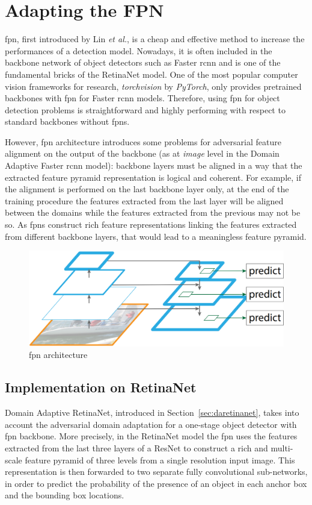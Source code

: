 \documentclass[%
    corpo=12pt,
    twoside,
    stile=classica,   
    tipotesi=magistrale,
    evenboxes,
    english,
	numerazioneromana,
]{toptesi}
\begin{document}
\section{Adapting the FPN}
\acrfull{fpn}, first introduced by Lin \textit{et al.}\cite{lin2017feature}, is a cheap and effective method to increase the performances of a detection model. Nowadays, it is often included in the backbone network of object detectors such as Faster \gls{rcnn} and is one of the fundamental bricks of the RetinaNet model. One of the most popular computer vision frameworks for research, \textit{torchvision} by \textit{PyTorch}\cite{paszke2019pytorch}, only provides pretrained backbones with \gls{fpn} for Faster \gls{rcnn} models. Therefore, using \gls{fpn} for object detection problems is straightforward and highly performing with respect to standard backbones without \glspl{fpn}.

However, \gls{fpn} architecture introduces some problems for adversarial feature alignment on the output of the backbone (as at \textit{image} level in the Domain Adaptive Faster \gls{rcnn} model): backbone layers must be aligned in a way that the extracted feature pyramid representation is logical and coherent. For example, if the alignment is performed on the last backbone layer only, at the end of the training procedure the features extracted from the last layer will be aligned between the domains while the features extracted from the previous may not be so. As \glspl{fpn} construct rich feature representations linking the features extracted from different backbone layers, that would lead to a meaningless feature pyramid.

\begin{figure}[ht]
	\centering
	\includegraphics[width=.6\linewidth]{imgs/fpn.png}
	\caption{\Gls{fpn} architecture\cite{chen2018domain}}
	\label{fig:fpn}
\end{figure}

\subsection{Implementation on RetinaNet}
Domain Adaptive RetinaNet, introduced in Section~\ref{sec:daretinanet}, takes into account the adversarial domain adaptation for a one-stage object detector with \gls{fpn} backbone. More precisely, in the RetinaNet model the \gls{fpn} uses the features extracted from the last three layers of a ResNet to construct a rich and multi-scale feature pyramid of three levels from a single resolution input image. This representation is then forwarded to two separate fully convolutional sub-networks, in order to predict the probability of the presence of an object in each anchor box and the bounding box locations.
\end{document}
